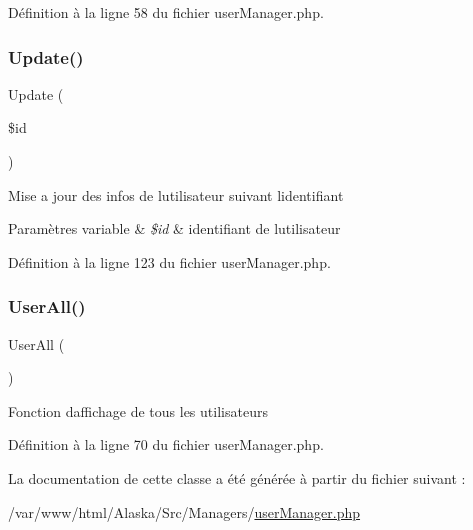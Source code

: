 Définition à la ligne 58 du fichier user\+Manager.\+php.

\mbox{\label{class_src_1_1_managers_1_1user_manager_a82232b33fbfacdbdb8a8f49acaecf564}} 
\subsubsection{\texorpdfstring{Update()}{Update()}}
{\footnotesize\ttfamily Update (\begin{DoxyParamCaption}\item[{}]{\$id }\end{DoxyParamCaption})}

Mise a jour des infos de l\textquotesingle{}utilisateur suivant l\textquotesingle{}identifiant 
\begin{DoxyParams}[1]{Paramètres}
variable & {\em \$id} & identifiant de l\textquotesingle{}utilisateur \\
\hline
\end{DoxyParams}


Définition à la ligne 123 du fichier user\+Manager.\+php.

\mbox{\label{class_src_1_1_managers_1_1user_manager_a0a377befd1052a5f989fd915af31373b}} 
\subsubsection{\texorpdfstring{User\+All()}{UserAll()}}
{\footnotesize\ttfamily User\+All (\begin{DoxyParamCaption}{ }\end{DoxyParamCaption})}

Fonction d\textquotesingle{}affichage de tous les utilisateurs 

Définition à la ligne 70 du fichier user\+Manager.\+php.



La documentation de cette classe a été générée à partir du fichier suivant \+:\begin{DoxyCompactItemize}
\item 
/var/www/html/\+Alaska/\+Src/\+Managers/\hyperlink{user_manager_8php}{user\+Manager.\+php}\end{DoxyCompactItemize}
